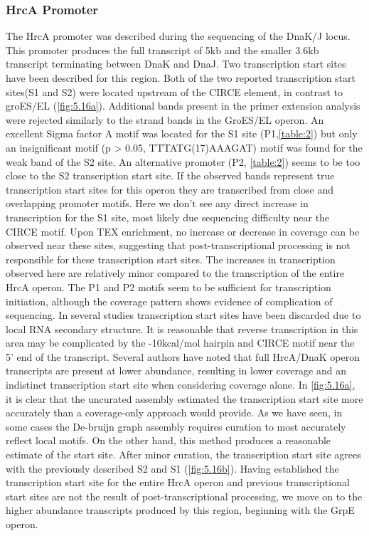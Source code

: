 \subsubsection{HrcA Promoter}
The HrcA promoter was described during the sequencing of the DnaK/J locus\cite{80}. This promoter produces the full transcript of 5kb and the smaller 3.6kb transcript terminating between DnaK and DnaJ. Two transcription start sites have been described for this region\cite{80}. Both of the two reported transcription start sites(S1 and S2) were located upstream of the CIRCE element, in contrast to groES/EL (\ref{fig:5.16a}). Additional bands present in the primer extension analysis were rejected similarly to the strand bands in the GroES/EL operon. An excellent Sigma factor A motif was located for the S1 site (P1,\ref{table:2}) but only an insignificant motif (p > 0.05, TTTATG(17)AAAGAT) motif was found for the weak band of the S2 site. An alternative promoter (P2, \ref{table:2}) seems to be too close to the S2 transcription start site. If the observed bands represent true transcription start sites for this operon they are transcribed from close and overlapping promoter motifs. Here we don't see any direct increase in transcription for the S1 site, most likely due sequencing difficulty near the CIRCE motif. Upon TEX enrichment, no increase or decrease in coverage can be observed near these sites, suggesting that post-transcriptional processing is not responsible for these transcription start sites. The increases in transcription observed here are relatively minor compared to the transcription of the entire HrcA operon. The P1 and P2 motifs seem to be sufficient for transcription initiation, although the coverage pattern shows evidence of complication of sequencing. In several studies\cite{76,80} transcription start sites have been discarded due to local RNA secondary structure. It is reasonable that reverse transcription in this area may be complicated by the -10kcal/mol hairpin and CIRCE motif near the 5' end of the transcript. Several authors have noted that full HrcA/DnaK operon transcripts are present at lower abundance\cite{80,81}, resulting in lower coverage and an indistinct transcription start site when considering coverage alone. In \ref{fig:5.16a}, it is clear that the uncurated assembly estimated the transcription start site more accurately than a coverage-only approach would provide. As we have seen, in some cases the De-bruijn graph assembly requires curation to most accurately reflect local motifs. On the other hand, this method produces a reasonable estimate of the start site. After minor curation, the transcription start site agrees with the previously described\cite{79} S2 and S1 (\ref{fig:5.16b}). Having established the transcription start site for the entire HrcA operon and previous transcriptional start sites are not the result of post-transcriptional processing, we move on to the higher abundance transcripts produced by this region, beginning with the GrpE operon.

